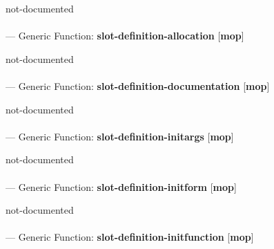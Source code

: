 \begin{adjustwidth}{5em}{5em}
not-documented
\end{adjustwidth}

\paragraph{}
\label{MOP:SLOT-DEFINITION-ALLOCATION}
--- Generic Function: \textbf{slot-definition-allocation} [\textbf{mop}] \textit{}

\begin{adjustwidth}{5em}{5em}
not-documented
\end{adjustwidth}

\paragraph{}
\label{MOP:SLOT-DEFINITION-DOCUMENTATION}
--- Generic Function: \textbf{slot-definition-documentation} [\textbf{mop}] \textit{}

\begin{adjustwidth}{5em}{5em}
not-documented
\end{adjustwidth}

\paragraph{}
\label{MOP:SLOT-DEFINITION-INITARGS}
--- Generic Function: \textbf{slot-definition-initargs} [\textbf{mop}] \textit{}

\begin{adjustwidth}{5em}{5em}
not-documented
\end{adjustwidth}

\paragraph{}
\label{MOP:SLOT-DEFINITION-INITFORM}
--- Generic Function: \textbf{slot-definition-initform} [\textbf{mop}] \textit{}

\begin{adjustwidth}{5em}{5em}
not-documented
\end{adjustwidth}

\paragraph{}
\label{MOP:SLOT-DEFINITION-INITFUNCTION}
--- Generic Function: \textbf{slot-definition-initfunction} [\textbf{mop}] \textit{}

